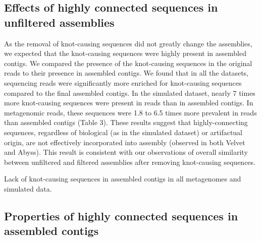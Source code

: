 \documentclass[11pt]{article} %
\begin{document}
\subsection{Effects of highly connected sequences in unfiltered assemblies}
As the removal of knot-causing sequences did not greatly change the assemblies, we expected that the knot-causing sequences were highly present in assembled contigs.  We compared the presence of the knot-causing sequences in the original reads to their presence in assembled contigs.  We found that in all the datasets, sequencing reads were significantly more enriched for knot-causing sequences compared to the final assembled contigs. In the simulated dataset, nearly 7 times more knot-causing sequences were present in reads than in assembled contigs. In metagenomic reads, these sequences were 1.8 to 6.5 times more prevalent in reads than assembled contigs (Table 3).  These results suggest that highly-connecting sequences, regardless of biological (as in the simulated dataset) or artifactual origin, are not effectively incorporated into assembly (observed in both Velvet and Abyss).  This result is consistent with our observations of overall similarity between unfiltered and filtered assemblies after removing knot-causing sequences.  

\begin{table}
\caption{Lack of knot-causing sequences in assembled contigs in all metagenomes and simulated data.}
\end{table}


\subsection{Properties of highly connected sequences in assembled contigs}
\end{document}
